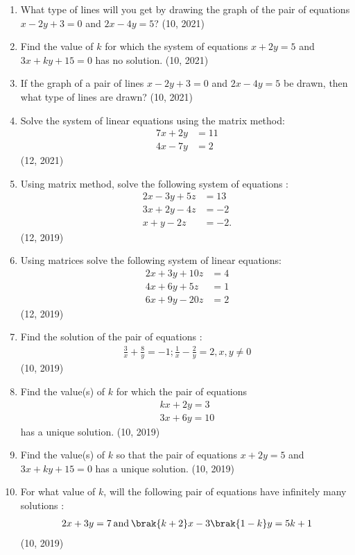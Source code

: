 \begin{enumerate}[label=\thesubsection.\arabic*,ref=\thesubsection.\theenumi]
    \item What type of lines will you get by drawing the graph of the pair of equations $x - 2y + 3 = 0$ and $2x - 4y = 5$?
\hfill (10, 2021)
    \item Find the value of $k$ for which the system of equations $x + 2y = 5$ and $3x + ky + 15 = 0$ has no solution.
\hfill (10, 2021)
    \item If the graph of a pair of lines $x - 2y + 3 = 0$ and $2x - 4y = 5$ be drawn, then what type of lines are drawn?
\hfill (10, 2021)
    \item Solve the system of linear equations using the matrix method:
    \begin{align*}
        7x + 2y &= 11 \\
        4x - 7y &= 2
    \end{align*}
\hfill (12, 2021)
\item Using matrix method, solve the following system of equations :
\begin{align*}
    2x-3y+5z&=13\\
    3x+2y-4z &=-2\\
    x+y-2z&=-2.
\end{align*}
\hfill (12, 2019)
\item Using matrices solve the following system of linear equations:
	\begin{align*}
		    2x+3y+10z&=4\\4x+6y+5z&=1\\6x+9y-20z&=2
	\end{align*}       
\hfill (12, 2019)
\item Find the solution of the pair of equations :
\begin{align*}
    \frac{3}{x}+\frac{8}{y}=-1; \frac{1}{x}-\frac{2}{y}=2, x, y\neq 0
\end{align*}
\hfill (10, 2019)

\item Find the value(s) of $k$ for which the pair of equations
\begin{align*}
    kx+2y=3\\
3x+6y=10
\end{align*}
has a unique solution.
\hfill (10, 2019)
 \item Find the value(s) of $k$ so that the pair of equations $x + 2y = 5$ and $3x + ky + 15 = 0$ has a unique solution.
\hfill (10, 2019)

 \item For what value of $k$, will the following pair of equations have infinitely many solutions :
\begin{align*}
	2x + 3y = 7 \hspace{2pt} \text{and} \hspace{2pt} \brak{k+2}x - 3\brak{1-k}y = 5k+1 
\end{align*}
\hfill (10, 2019)


\end{enumerate}
